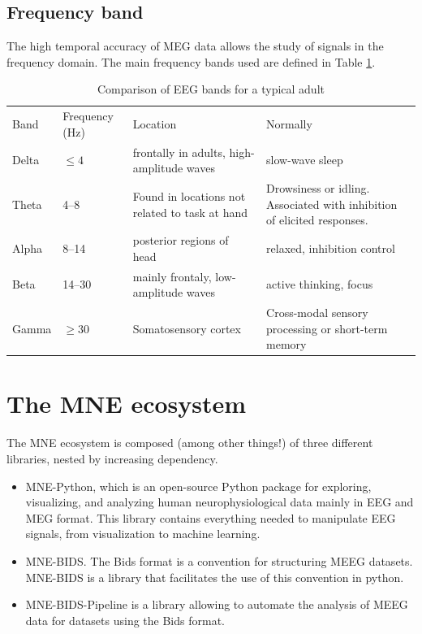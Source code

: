 \subsection{Frequency band}


The high temporal accuracy of MEG data allows the study of signals in the frequency domain. The main frequency bands used are defined in Table \ref{Tab:neural_freq_band}.

\begin{table}[ht]
    \caption{Comparison of EEG bands for a typical adult}
    \centering
    \begin{tabular}{@{}| p{1.2cm}|p{2.5cm}| p{4.5cm}|p{4.5cm}| @{}}
        \hline
        Band  & Frequency (Hz) & Location                                       & Normally                                                                \\
        Delta & $\leq  4$      & frontally in adults, high-amplitude waves      & slow-wave sleep                                                         \\
        Theta & 4–8            & Found in locations not related to task at hand & Drowsiness or idling. Associated with inhibition of elicited responses. \\
        Alpha & 8–14           & posterior regions of head                      & relaxed, inhibition control                                             \\
        Beta  & 14–30          & mainly frontaly, low-amplitude waves           & active thinking, focus                                                  \\
        Gamma & $\geq 30$      & Somatosensory cortex                           & Cross-modal sensory processing or short-term memory                     \\
        \hline
    \end{tabular}
    \label{Tab:neural_freq_band}
\end{table}


\section{The MNE ecosystem}

The MNE ecosystem is composed (among other things!) of three different libraries, nested by increasing dependency.

\begin{itemize}
    \item MNE-Python, which is an open-source Python package for exploring, visualizing, and analyzing human neurophysiological data mainly in EEG and MEG format. This library contains everything needed to manipulate EEG signals, from visualization to machine learning.
    \item MNE-BIDS. The Bids format is a convention for structuring MEEG datasets. MNE-BIDS is a library that facilitates the use of this convention in python.
    \item MNE-BIDS-Pipeline is a library allowing to automate the analysis of MEEG data for datasets using the Bids format.
\end{itemize}

